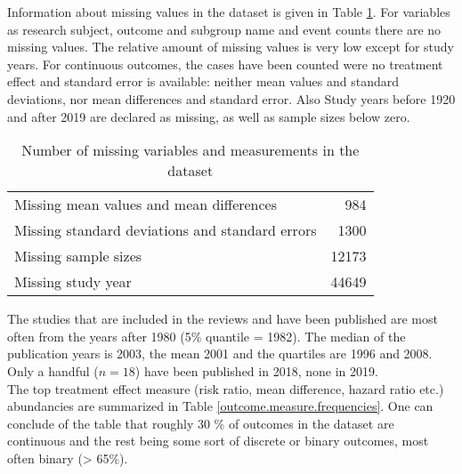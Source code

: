 Information about missing values in the dataset is given in Table \ref{missing}. For variables as research subject, outcome and subgroup name and event counts there are no missing values. The relative amount of missing values is very low except for study years. For continuous outcomes, the cases have been counted were no treatment effect and standard error is available: neither mean values and standard deviations, nor mean differences and standard error. Also Study years before 1920 and after 2019 are declared as missing, as well as sample sizes below zero.

\begin{table}[ht]
\centering
\begingroup\footnotesize
\begin{tabular}{lr}
  \hline
  \hline
Missing mean values and mean differences & 984 \\ 
  Missing standard deviations and standard errors & 1300 \\ 
  Missing sample sizes & 12173 \\ 
  Missing study year & 44649 \\ 
   \hline
\end{tabular}
\endgroup
\caption{Number of missing variables and measurements in the dataset} 
\label{missing}
\end{table}


The studies that are included in the reviews and have been published are most often from the years after 1980 (5\% quantile = 1982). The median of the publication years is 2003, the mean 2001 and the quartiles are 1996 and 2008. Only a handful ($n = 18$) have been published in 2018, none in 2019. \\
The top treatment effect measure (risk ratio, mean difference, hazard ratio etc.) abundancies are summarized in Table \ref{outcome.measure.frequencies}. One can conclude of the table that roughly 30 \% of outcomes in the dataset are continuous and the rest being some sort of discrete or binary outcomes, most often binary (> 65\%).

